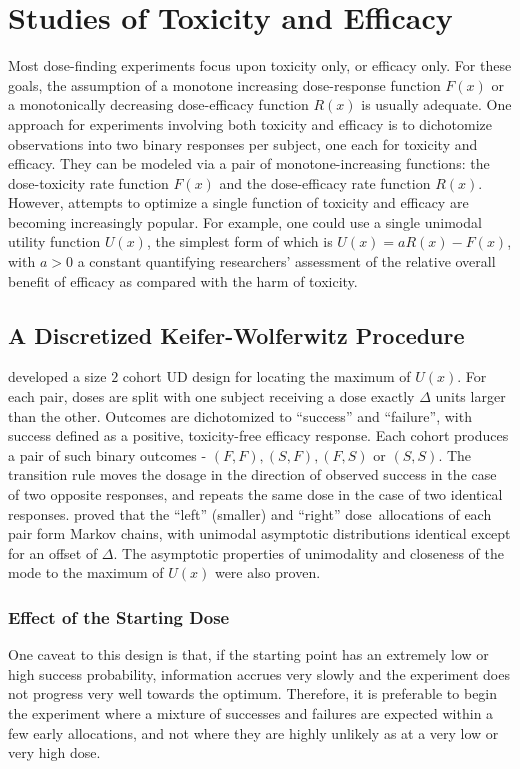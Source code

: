 \chapter{Studies of Toxicity and Efficacy }

Most dose-finding experiments focus upon toxicity only, or efficacy only. For these goals, the assumption of a monotone increasing dose-response function $F(x)$ or a monotonically decreasing dose-efficacy function $R(x)$ is usually adequate.
One approach for experiments involving both toxicity and efficacy is to dichotomize observations into two binary responses per subject, one each for toxicity and efficacy. They can be modeled via a pair of monotone-increasing functions: the dose-toxicity rate function $F(x)$ and the dose-efficacy rate function $R(x)$.
However, attempts to optimize a single function of toxicity and efficacy are becoming increasingly popular.  For example, one could use a single unimodal utility function $U(x)$, the simplest form of which is $U(x)=aR(x)-F(x)$, with $a>0$ a constant quantifying researchers' assessment of the relative overall benefit of efficacy as compared with the harm of toxicity.

\section{A Discretized Keifer-Wolferwitz Procedure}
\cite{Kpam:Flou:opti:2001} developed a size $2$ cohort UD design for locating the maximum of $U(x)$. For each pair, doses are split with one subject receiving a dose  exactly $\Delta$ units larger than the other. Outcomes are dichotomized to ``success'' and ``failure'', with success defined as a positive, toxicity-free efficacy response. Each cohort produces a pair of such binary outcomes - $(F,F),(S,F),(F,S)$ or $(S,S)$. The transition rule moves the dosage in the direction of observed success in the case of two opposite responses, and repeats the same dose in the case of two identical responses. \cite{Kpam:Flou:opti:2008} proved that the ``left'' (smaller) and ``right'' dose~allocations of each pair form Markov chains, with unimodal asymptotic distributions identical except for an offset of $\Delta$. The asymptotic properties of unimodality and closeness of the mode to the maximum of $U(x)$ were also proven.

\subsection{Effect of the Starting Dose}
One caveat to this design is that, if the starting point has an extremely low or high success probability, information accrues very slowly and the experiment does not progress very well towards the optimum. Therefore, it is preferable to begin the experiment where a mixture of successes and failures are expected within a few early allocations, and not where they are highly unlikely as at a very low or  very high dose.

